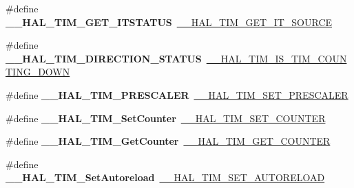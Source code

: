 \begin{DoxyCompactItemize}
\#define {\bfseries \+\_\+\+\_\+\+H\+A\+L\+\_\+\+T\+I\+M\+\_\+\+G\+E\+T\+\_\+\+I\+T\+S\+T\+A\+T\+US}~\hyperlink{group___t_i_m___exported___macros_ga644babf93470a6eee6bce8906c4da5c5}{\+\_\+\+\_\+\+H\+A\+L\+\_\+\+T\+I\+M\+\_\+\+G\+E\+T\+\_\+\+I\+T\+\_\+\+S\+O\+U\+R\+CE}
\item 
\mbox{\label{group___h_a_l___t_i_m___aliased___macros_ga76886ef4a5712e8627ea09ff564cdff2}} 
\#define {\bfseries \+\_\+\+\_\+\+H\+A\+L\+\_\+\+T\+I\+M\+\_\+\+D\+I\+R\+E\+C\+T\+I\+O\+N\+\_\+\+S\+T\+A\+T\+US}~\hyperlink{group___t_i_m___exported___macros_gac73f5e7669d92971830481e7298e98ba}{\+\_\+\+\_\+\+H\+A\+L\+\_\+\+T\+I\+M\+\_\+\+I\+S\+\_\+\+T\+I\+M\+\_\+\+C\+O\+U\+N\+T\+I\+N\+G\+\_\+\+D\+O\+WN}
\item 
\mbox{\label{group___h_a_l___t_i_m___aliased___macros_ga64fdbe2a68fc8459071ee0dcb9096e34}} 
\#define {\bfseries \+\_\+\+\_\+\+H\+A\+L\+\_\+\+T\+I\+M\+\_\+\+P\+R\+E\+S\+C\+A\+L\+ER}~\hyperlink{group___t_i_m___exported___macros_gafdc5a06eab07e0c24e729fd492bdb27c}{\+\_\+\+\_\+\+H\+A\+L\+\_\+\+T\+I\+M\+\_\+\+S\+E\+T\+\_\+\+P\+R\+E\+S\+C\+A\+L\+ER}
\item 
\mbox{\label{group___h_a_l___t_i_m___aliased___macros_ga23ef14334077dc01d9e6d8bfa6614260}} 
\#define {\bfseries \+\_\+\+\_\+\+H\+A\+L\+\_\+\+T\+I\+M\+\_\+\+Set\+Counter}~\hyperlink{group___t_i_m___exported___macros_ga9746ac75e4cd25cec1a9ebac8cb82b97}{\+\_\+\+\_\+\+H\+A\+L\+\_\+\+T\+I\+M\+\_\+\+S\+E\+T\+\_\+\+C\+O\+U\+N\+T\+ER}
\item 
\mbox{\label{group___h_a_l___t_i_m___aliased___macros_ga074ff6af2efe776a0e76622bf8d4c85a}} 
\#define {\bfseries \+\_\+\+\_\+\+H\+A\+L\+\_\+\+T\+I\+M\+\_\+\+Get\+Counter}~\hyperlink{group___t_i_m___exported___macros_gaf1af08014b9d06efbbb091d58d47c8ba}{\+\_\+\+\_\+\+H\+A\+L\+\_\+\+T\+I\+M\+\_\+\+G\+E\+T\+\_\+\+C\+O\+U\+N\+T\+ER}
\item 
\mbox{\label{group___h_a_l___t_i_m___aliased___macros_ga8857297381807be432e6b6eb98fdb591}} 
\#define {\bfseries \+\_\+\+\_\+\+H\+A\+L\+\_\+\+T\+I\+M\+\_\+\+Set\+Autoreload}~\hyperlink{group___t_i_m___exported___macros_ga1e6300cab1e34ecaaf490dc7d4812d69}{\+\_\+\+\_\+\+H\+A\+L\+\_\+\+T\+I\+M\+\_\+\+S\+E\+T\+\_\+\+A\+U\+T\+O\+R\+E\+L\+O\+AD}

\end{DoxyCompactItemize}
